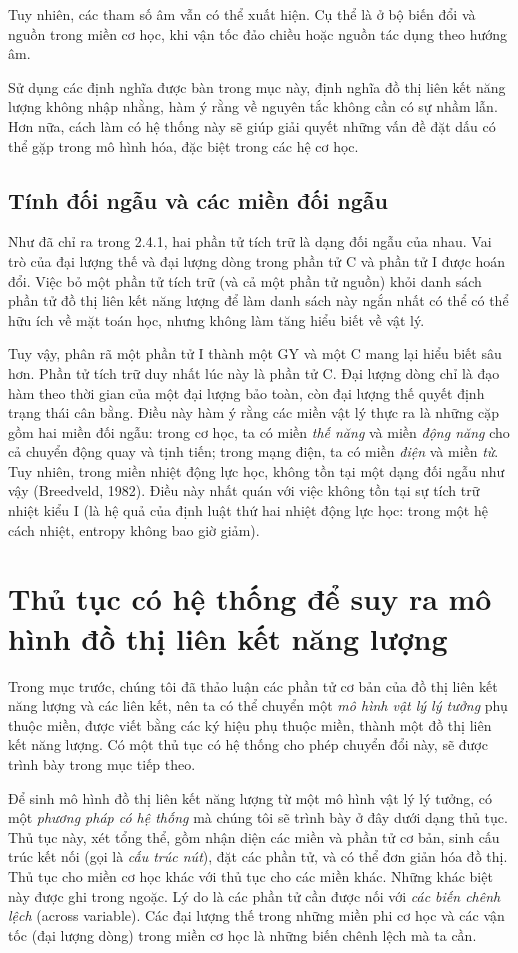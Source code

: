 Tuy nhiên, các tham số âm vẫn có thể xuất hiện. Cụ thể là ở bộ biến đổi và nguồn trong miền cơ học, khi vận tốc đảo chiều hoặc nguồn tác dụng theo hướng âm.

Sử dụng các định nghĩa được bàn trong mục này, định nghĩa đồ thị liên kết năng lượng không nhập nhằng, hàm ý rằng về nguyên tắc không cần có sự nhầm lẫn. Hơn nữa, cách làm có hệ thống này sẽ giúp giải quyết những vấn đề đặt dấu có thể gặp trong mô hình hóa, đặc biệt trong các hệ cơ học.
\subsection{Tính đối ngẫu và các miền đối ngẫu}
Như đã chỉ ra trong 2.4.1, hai phần tử tích trữ là dạng đối ngẫu của nhau. Vai trò của đại lượng thế và đại lượng dòng trong phần tử C và phần tử I được hoán đổi. Việc bỏ một phần tử tích trữ (và cả một phần tử nguồn) khỏi danh sách phần tử đồ thị liên kết năng lượng để làm danh sách này ngắn nhất có thể có thể hữu ích về mặt toán học, nhưng không làm tăng hiểu biết về vật lý.

Tuy vậy, phân rã một phần tử I thành một GY và một C mang lại hiểu biết sâu hơn. Phần tử tích trữ duy nhất lúc này là phần tử C. Đại lượng dòng chỉ là đạo hàm theo thời gian của một đại lượng bảo toàn, còn đại lượng thế quyết định trạng thái cân bằng. Điều này hàm ý rằng các miền vật lý thực ra là những cặp gồm hai miền đối ngẫu: trong cơ học, ta có miền \emph{thế năng} và miền \emph{động năng} cho cả chuyển động quay và tịnh tiến; trong mạng điện, ta có miền \emph{điện} và miền \emph{từ}. Tuy nhiên, trong miền nhiệt động lực học, không tồn tại một dạng đối ngẫu như vậy (Breedveld, 1982). Điều này nhất quán với việc không tồn tại sự tích trữ nhiệt kiểu I (là hệ quả của định luật thứ hai nhiệt động lực học: trong một hệ cách nhiệt, entropy không bao giờ giảm).

\section{Thủ tục có hệ thống để suy ra mô hình đồ thị liên kết năng lượng}
Trong mục trước, chúng tôi đã thảo luận các phần tử cơ bản của đồ thị liên kết năng lượng và các liên kết, nên ta có thể chuyển một \emph{mô hình vật lý lý tưởng} phụ thuộc miền, được viết bằng các ký hiệu phụ thuộc miền, thành một đồ thị liên kết năng lượng. Có một thủ tục có hệ thống cho phép chuyển đổi này, sẽ được trình bày trong mục tiếp theo.

Để sinh mô hình đồ thị liên kết năng lượng từ một mô hình vật lý lý tưởng, có một \emph{phương pháp có hệ thống} mà chúng tôi sẽ trình bày ở đây dưới dạng thủ tục. Thủ tục này, xét tổng thể, gồm nhận diện các miền và phần tử cơ bản, sinh cấu trúc kết nối (gọi là \emph{cấu trúc nút}), đặt các phần tử, và có thể đơn giản hóa đồ thị. Thủ tục cho miền cơ học khác với thủ tục cho các miền khác. Những khác biệt này được ghi trong ngoặc. Lý do là các phần tử cần được nối với \emph{các biến chênh lệch} (across variable). Các đại lượng thế trong những miền phi cơ học và các vận tốc (đại lượng dòng) trong miền cơ học là những biến chênh lệch mà ta cần.

